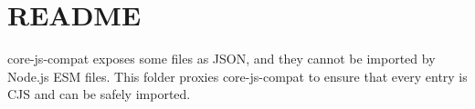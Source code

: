\chapter{README}
\hypertarget{md_node__modules_2babel-plugin-polyfill-corejs3_2core-js-compat_2README}{}\label{md_node__modules_2babel-plugin-polyfill-corejs3_2core-js-compat_2README}
{\ttfamily core-\/js-\/compat} exposes some files as JSON, and they cannot be imported by Node.\+js ESM files. This folder proxies {\ttfamily core-\/js-\/compat} to ensure that every entry is CJS and can be safely imported. 